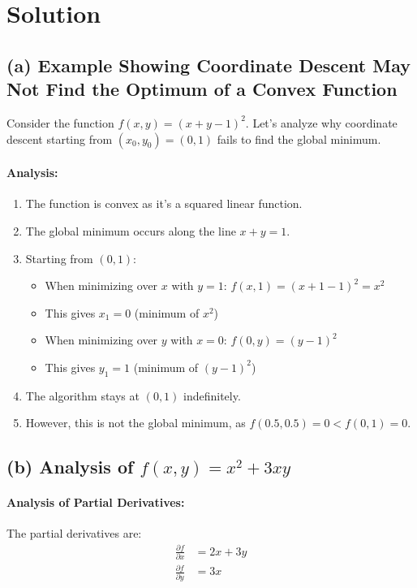 \documentclass{article}
\begin{document}
\section*{Solution}

\subsection*{(a) Example Showing Coordinate Descent May Not Find the Optimum of a Convex Function}

Consider the function $f(x, y) = (x + y - 1)^2$. Let's analyze why coordinate descent starting from $(x_0, y_0) = (0, 1)$ fails to find the global minimum.

\paragraph{Analysis:}
\begin{enumerate}
    \item The function is convex as it's a squared linear function.
    \item The global minimum occurs along the line $x + y = 1$.
    \item Starting from $(0, 1)$:
    \begin{itemize}
        \item When minimizing over $x$ with $y=1$: $f(x, 1) = (x + 1 - 1)^2 = x^2$
        \item This gives $x_1 = 0$ (minimum of $x^2$)
        \item When minimizing over $y$ with $x=0$: $f(0, y) = (y - 1)^2$
        \item This gives $y_1 = 1$ (minimum of $(y-1)^2$)
    \end{itemize}
    \item The algorithm stays at $(0, 1)$ indefinitely.
    \item However, this is not the global minimum, as $f(0.5, 0.5) = 0 < f(0, 1) = 0$.
\end{enumerate}

\subsection*{(b) Analysis of $f(x,y) = x^2 + 3xy$}

\paragraph{Analysis of Partial Derivatives:}
The partial derivatives are:
\begin{align*}
    \frac{\partial f}{\partial x} &= 2x + 3y \\
    \frac{\partial f}{\partial y} &= 3x
\end{align*}
\end{document}
